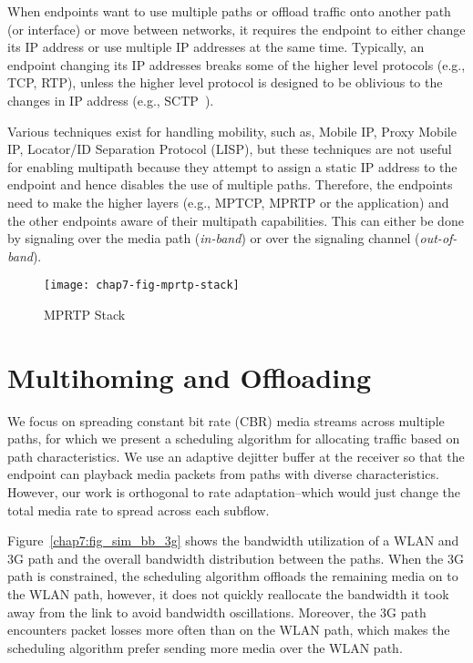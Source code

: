 When endpoints want to use multiple paths or offload traffic onto another path
(or interface) or move between networks, it requires the endpoint to either
change its IP address or use multiple IP addresses at the same time.
Typically, an endpoint changing its IP addresses breaks some of the higher
level protocols (e.g., TCP, RTP), unless the higher level protocol is designed
to be oblivious to the changes in IP address (e.g., SCTP~\cite{rfc4960}).

Various techniques exist for handling mobility, such as, Mobile IP, Proxy
Mobile IP, Locator/ID Separation Protocol (LISP), but these techniques are not
useful for enabling multipath because they attempt to assign a static IP
address to the endpoint and hence disables the use of multiple paths.
Therefore, the endpoints need to make the higher layers (e.g., MPTCP, MPRTP or
the application) and the other endpoints aware of their multipath
capabilities. This can either be done by signaling over the media path
(\emph{in-band}) or over the signaling channel (\emph{out-of-band}).


\begin{figure}
\centerline {
\texttt{[image: chap7-fig-mprtp-stack]}
}
\caption{MPRTP Stack}
\label{chap7:fig_mprtp_arch}
\end{figure}


\section{Multihoming and Offloading}

We focus on spreading constant bit rate (CBR) media streams across multiple
paths, for which we present a scheduling algorithm for allocating traffic
based on path characteristics. We use an adaptive dejitter buffer at the
receiver so that the endpoint can playback media packets from paths with
diverse characteristics. However, our work is orthogonal to rate
adaptation--which would just change the total media rate to spread across each
subflow.

Figure~\ref{chap7:fig_sim_bb_3g} shows the bandwidth utilization of a WLAN and
3G path and the overall bandwidth distribution between the paths. When the 3G
path is constrained, the scheduling algorithm offloads the remaining media on
to the WLAN path, however, it does not quickly reallocate the bandwidth it
took away from the link to avoid bandwidth oscillations. Moreover, the 3G path
encounters packet losses more often than on the WLAN path, which makes the
scheduling algorithm prefer sending more media over the WLAN path.

